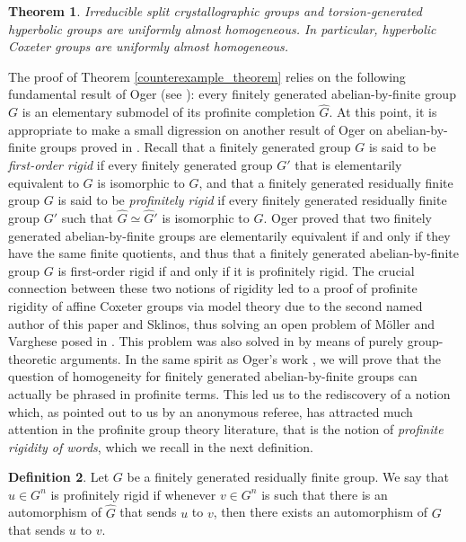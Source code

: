 \documentclass[a4paper, 11pt]{amsart}
\newtheorem{te}{Theorem}[section]
\theoremstyle{definition}
\newtheorem{de}[te]{Definition}
\theoremstyle{remark}
\begin{document}
\begin{te}\label{almost_h}
Irreducible split crystallographic groups and torsion-generated hyperbolic groups are uniformly almost homogeneous. In particular, hyperbolic Coxeter groups are uniformly almost homogeneous.\end{te}

\smallskip

The proof of Theorem \ref{counterexample_theorem} relies on the following fundamental result of Oger (see \cite{Oger88}): every finitely generated abelian-by-finite group $G$ is an elementary submodel of its profinite completion $\widehat{G}$. At this point, it is appropriate to make a small digression on another result of Oger on abelian-by-finite groups proved in \cite{Oger88}. Recall that a finitely generated group $G$ is said to be \emph{first-order rigid} if every finitely generated group $G'$ that is elementarily equivalent to $G$ is isomorphic to $G$, and that a finitely generated residually finite group $G$ is said to be \emph{profinitely rigid} if every finitely generated residually finite group $G'$ such that $\widehat{G}\simeq \widehat{G}'$ is isomorphic to $G$. Oger proved that two finitely generated abelian-by-finite groups are elementarily equivalent if and only if they have the same finite quotients, and thus that a finitely generated abelian-by-finite group $G$ is first-order rigid if and only if it is profinitely rigid. The crucial connection between these two notions of rigidity led to a proof of profinite rigidity of affine Coxeter groups via model theory due to the second named author of this paper and Sklinos, thus solving an open problem of M\"oller and Varghese posed in \cite{MV}. This problem was also solved in \cite{CHMV} by means of purely group-theoretic arguments. In the same spirit as Oger's work \cite{Oger88}, we will prove that the question of homogeneity for finitely generated abelian-by-finite groups can actually be phrased in profinite terms. This led us to the rediscovery of a notion which, as pointed out to us by an anonymous referee, has attracted much attention in the profinite group theory literature, that is the notion of {\em profinite rigidity of words}, which we recall in the next definition. 

\begin{de}Let $G$ be a finitely generated residually finite group. We say that $u \in G^n$ is profinitely rigid if whenever $v \in G^n$ is such that there is an automorphism of $\widehat{G}$ that sends $u$ to $v$, then there exists an automorphism of $G$ that sends $u$ to $v$.
\end{de}
\end{document}
